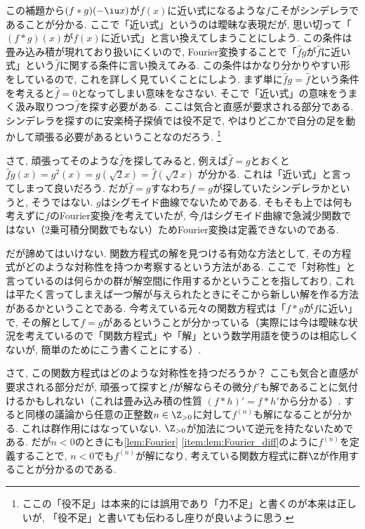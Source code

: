 \documentclass[11pt,b5paper,oneside,lualatex]{ltjsarticle} %
\numberwithin{equation}{section} %
\begin{document}
この補題から$ (f \ast g)(-\iu x) $が$ f(x) $に近い式になるような$ f $こそがシンデレラであることが分かる. 
ここで「近い式」というのは曖昧な表現だが, 思い切って「$ (f \ast g)(x) $が$ f(x) $に近い式」と言い換えてしまうことにしよう. 
この条件は畳み込み積が現れており扱いにくいので, Fourier変換することで「$ \widehat{f} g $が$ \widehat{f} $に近い式」という$ \widehat{f} $に関する条件に言い換えてみる. 
この条件はかなり分かりやすい形をしているので, これを詳しく見ていくことにしよう. 
まず単に$ \widehat{f} g = \widehat{f} $という条件を考えると$ \widehat{f} = 0 $となってしまい意味をなさない. 
そこで「近い式」の意味をうまく汲み取りつつ$ \widehat{f} $を探す必要がある. 
ここは気合と直感が要求される部分である. 
シンデレラを探すのに安楽椅子探偵では役不足で, やはりどこかで自分の足を動かして頑張る必要があるということなのだろう. 
\footnote{ここの「役不足」は本来的には誤用であり「力不足」と書くのが本来は正しいが, 「役不足」と書いても伝わるし座りが良いように思う. }

さて, 頑張ってそのような$ \widehat{f} $を探してみると, 例えば$ \widehat{f} = g $とおくと
$ \widehat{f} g (x) = g^2 (x) = g(\sqrt{2} x) = \widehat{f} (\sqrt{2} x) $
が分かる. 
これは「近い式」と言ってしまって良いだろう. 
だが$ \widehat{f} = g $すなわち$ f = g $が探していたシンデレラかというと, そうではない. 
$ g $はシグモイド曲線でないためである. 
そもそも上では何も考えずに$ f $のFourier変換$ \widehat{f} $を考えていたが, 今$ f $はシグモイド曲線で急減少関数ではない（$ 2 $乗可積分関数でもない）ためFourier変換は定義できないのである. 

だが諦めてはいけない. 
関数方程式の解を見つける有効な方法として, その方程式がどのような対称性を持つか考察するという方法がある. 
ここで「対称性」と言っているのは何らかの群が解空間に作用するかということを指しており, これは平たく言ってしまえば一つ解が与えられたときにそこから新しい解を作る方法があるかということである. 
今考えている元々の関数方程式は「$ f \ast g $が$ f $に近い」で, その解として$ f = g $があるということが分かっている（実際には今は曖昧な状況を考えているので「関数方程式」や「解」という数学用語を使うのは相応しくないが, 簡単のためにこう書くことにする）. 

さて, この関数方程式はどのような対称性を持つだろうか？
ここも気合と直感が要求される部分だが, 頑張って探すと$ f $が解ならその微分$ f' $も解であることに気付けるかもしれない（これは畳み込み積の性質
$ (f \ast h)' = f \ast h' $から分かる）. 
すると同様の議論から任意の正整数$ n \in \Z_{>0} $に対して$ f^{(n)} $も解になることが分かる. 
これは群作用にはなっていない. $ \Z_{>0} $が加法について逆元を持たないためである. 
だが$ n < 0 $のときにも\cref{lem:Fourier} \cref{item:lem:Fourier_diff}のように$ f^{(n)} $を定義することで, $ n < 0 $でも$ f^{(n)} $が解になり, 考えている関数方程式に群$ \Z $が作用することが分かるのである. 
\end{document}
